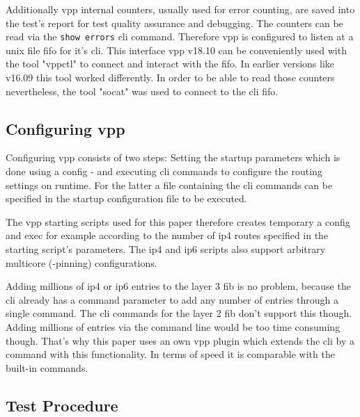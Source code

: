 Additionally \Ac{vpp} internal counters, usually used for error
counting, are saved into the test's report for test quality assurance
and debugging. The counters can be read via the \lstinline|show errors|
 \Ac{cli} command. Therefore \Ac{vpp} is configured to listen
at a unix file fifo for it's \Ac{cli}. This interface \Ac{vpp} v18.10
can be conveniently used with the tool "vppctl" to connect and
interact with the fifo. In earlier versions like v16.09 this tool
worked differently. In order to be able to read those counters
nevertheless, the tool "socat" was used to connect to the \Ac{cli}
fifo.


\subsection{Configuring \Ac{vpp}}


Configuring \Ac{vpp} consists of two steps: Setting the startup
parameters which is done using a \Ac{config} - and executing \Ac{cli}
commands to configure the routing settings on runtime. For the latter
a file containing the \Ac{cli} commands can be specified in the
startup configuration file to be executed. 

The vpp starting scripts used for this paper therefore creates
temporary a \Ac{config} and \Ac{exec} for example according to the
number of \Ac{ip4} routes specified in the starting script's
parameters. The \Ac{ip4} and \Ac{ip6} scripts also support arbitrary
multicore (-pinning) configurations.


Adding millions of \Ac{ip4} or \Ac{ip6} entries to the layer 3
\Ac{fib} is no problem, because the \Ac{cli} already has a command
parameter to add any number of entries through a single command. The
\Ac{cli} commands for the layer 2 \Ac{fib} don't support this though.
Adding millions of entries via the command line would be too time
consuming though. That's why this paper uses an own \Ac{vpp} plugin
which extends the \Ac{cli} by a command with this functionality. In
terms of speed it is comparable with the built-in commands.


\subsection{Test Procedure}

